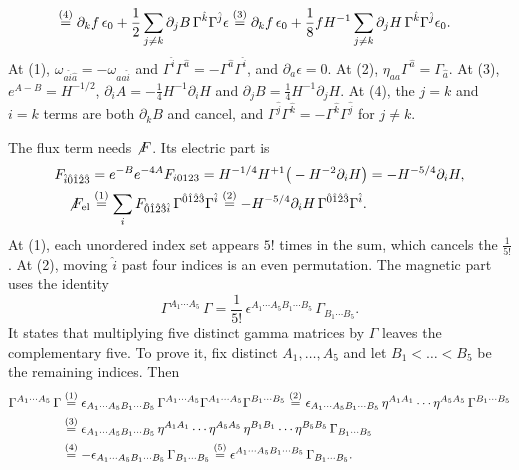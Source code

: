 \begin{tcolorbox}[breakable]
\begin{remark}
\begin{align*}
&\eqs{4} \partial_kf\,\epsilon_0 + \frac12\sum_{j\ne k}\partial_jB\,\Gamma^{\hat k}\Gamma^{\hat j}\epsilon
\eqs{3} \partial_kf\,\epsilon_0 + \frac18 fH^{-1}\sum_{j\ne k}\partial_jH\,\Gamma^{\hat k}\Gamma^{\hat j}\epsilon_0 .
\end{align*}
At (1), $\omega_{a\hat i\hat a} = -\omega_{a\hat a\hat i}$ and $\Gamma^{\hat i}\Gamma^{\hat a} = -\Gamma^{\hat a}\Gamma^{\hat i}$, and $\partial_a\epsilon = 0$. At (2), $\eta_{aa}\Gamma^{\hat a} = \Gamma_{\hat a}$. At (3), $e^{A-B} = H^{-1/2}$, $\partial_iA = -\frac14H^{-1}\partial_iH$ and $\partial_jB = \frac14H^{-1}\partial_jH$. At (4), the $j=k$ and $i=k$ terms are both $\partial_kB$ and cancel, and $\Gamma^{\hat j}\Gamma^{\hat k} = -\Gamma^{\hat k}\Gamma^{\hat j}$ for $j\ne k$.

The flux term needs $\slashed F$. Its electric part is
\begin{align*}
F_{\hat i\hat0\hat1\hat2\hat3} &= e^{-B}e^{-4A}F_{i0123} = H^{-1/4}H^{+1}\big(-H^{-2}\partial_iH\big) = -H^{-5/4}\partial_iH, \\
\slashed F_{\rm el} & \eqs{1} \sum_i F_{\hat0\hat1\hat2\hat3\hat i}\,\Gamma^{\hat0\hat1\hat2\hat3}\Gamma^{\hat i} \eqs{2} -H^{-5/4}\partial_iH\,\Gamma^{\hat0\hat1\hat2\hat3}\Gamma^{\hat i} .
\end{align*}
At (1), each unordered index set appears $5!$ times in the sum, which cancels the $\frac{1}{5!}$. At (2), moving $\hat i$ past four indices is an even permutation. The magnetic part uses the identity
\begin{equation*}
\Gamma^{A_1\cdots A_5}\,\Gamma = \frac{1}{5!}\,\epsilon^{A_1\cdots A_5B_1\cdots B_5}\,\Gamma_{B_1\cdots B_5}.
\end{equation*}
It states that multiplying five distinct gamma matrices by $\Gamma$ leaves the complementary five. To prove it, fix distinct $A_1,\dots,A_5$ and let $B_1<\dots<B_5$ be the remaining indices. Then
\begin{align*}
\Gamma^{A_1\cdots A_5}\,\Gamma &\eqs{1} \epsilon_{A_1\cdots A_5B_1\cdots B_5}\,\Gamma^{A_1\cdots A_5}\Gamma^{A_1\cdots A_5}\Gamma^{B_1\cdots B_5}
\eqs{2} \epsilon_{A_1\cdots A_5B_1\cdots B_5}\,\eta^{A_1A_1}\cdots\eta^{A_5A_5}\,\Gamma^{B_1\cdots B_5} \\
&\eqs{3} \epsilon_{A_1\cdots A_5B_1\cdots B_5}\,\eta^{A_1A_1}\cdots\eta^{A_5A_5}\,\eta^{B_1B_1}\cdots\eta^{B_5B_5}\,\Gamma_{B_1\cdots B_5} \\
&\eqs{4} -\epsilon_{A_1\cdots A_5B_1\cdots B_5}\,\Gamma_{B_1\cdots B_5}
\eqs{5} \epsilon^{A_1\cdots A_5B_1\cdots B_5}\,\Gamma_{B_1\cdots B_5} .

\end{align*}
\end{remark}
\end{tcolorbox}
